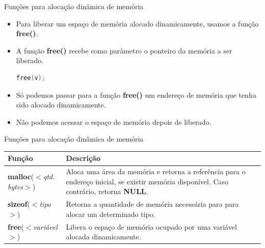 \begin{frame}[fragile,c]{Funções para alocação dinâmica de memória}
  \begin{itemize}[<+->]
    \item Para liberar um espaço de memória alocado dinamicamente, usamos a função \textbf{free()}.
    \item A função \textbf{free()} recebe como parâmetro o ponteiro da memória a ser liberado.
\begin{lstlisting}[language=C]
free(v);
\end{lstlisting}
    \item Só podemos passar para a função \textbf{free()} um endereço de memória que tenha sido alocado dinamicamente.
    \item Não podemos acessar o espaço de memória depois de liberado.
  \end{itemize}  
\end{frame}

\begin{frame}[fragile,c]{Funções para alocação dinâmica de memória}
  \begin{table}
   \centering
    \begin{tabular}{p{4cm}p{6cm}}
      \hline \textbf{Função} & \textbf{Descrição} \\
      \hline  \textbf{malloc}(\textit{$<$qtd. bytes$>$}) & Aloca uma área da memória e retorna a referência para o endereço inicial, se existir memória disponível. Caso contrário, retorna \textbf{NULL}.  \\
      \hline \textbf{sizeof}(\textit{$<$tipo$>$})  & Retorna a quantidade de memória necessária para para alocar um determinado tipo.\\
      \hline \textbf{free}(\textit{$<$variável$>$})  & Libera o espaço de memória ocupado por uma variável alocada dinamicamente.\\
      \hline
    \end{tabular}
  \end{table} 
\end{frame}
